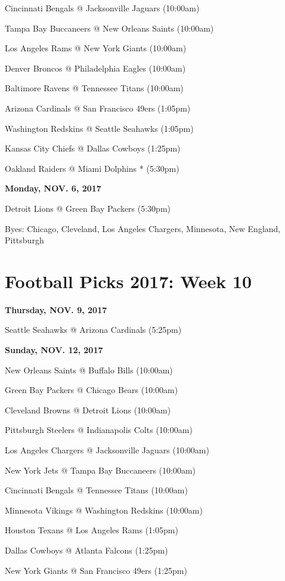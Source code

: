 \documentclass[11pt, letterpaper]{article}
\begin{document}
Cincinnati Bengals @ Jacksonville Jaguars (10:00am)\par
Tampa Bay Buccaneers @ New Orleans Saints (10:00am)\par
Los Angeles Rams @ New York Giants (10:00am)\par
Denver Broncos @ Philadelphia Eagles (10:00am)\par
Baltimore Ravens @ Tennessee Titans (10:00am)\par
Arizona Cardinals @ San Francisco 49ers (1:05pm)\par
Washington Redskins @ Seattle Seahawks (1:05pm)\par
Kansas City Chiefs @ Dallas Cowboys (1:25pm)\par
Oakland Raiders @ Miami Dolphins * (5:30pm)\par
\noindent \normalsize \textbf{Monday, NOV. 6, 2017} \par
Detroit Lions @ Green Bay Packers (5:30pm)\par
\vfill{}
Byes: Chicago,  Cleveland,  Los    Angeles
                      Chargers,  Minnesota,  New England,  Pittsburgh
\newpage \section*{\LARGE Football Picks 2017: Week 10}
\noindent \normalsize \textbf{Thursday, NOV.    9, 2017} \par
Seattle Seahawks @ Arizona Cardinals (5:25pm)\par
\noindent \normalsize \textbf{Sunday, NOV. 12, 2017} \par
New Orleans Saints @ Buffalo Bills (10:00am)\par
Green Bay Packers @ Chicago Bears (10:00am)\par
Cleveland Browns @ Detroit Lions (10:00am)\par
Pittsburgh Steelers @ Indianapolis Colts (10:00am)\par
Los Angeles Chargers @ Jacksonville Jaguars (10:00am)\par
New York Jets @ Tampa Bay Buccaneers (10:00am)\par
Cincinnati Bengals @ Tennessee Titans (10:00am)\par
Minnesota Vikings @ Washington Redskins (10:00am)\par
Houston Texans @ Los Angeles Rams (1:05pm)\par
Dallas Cowboys @ Atlanta Falcons (1:25pm)\par
New York Giants @ San Francisco 49ers (1:25pm)\par
\end{document}
